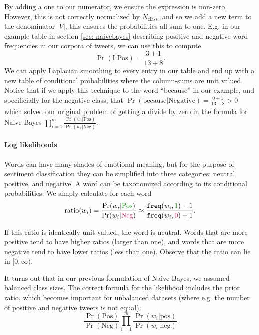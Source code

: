\documentclass[12pt]{article}
\begin{document}
By adding a one to our numerator, we ensure the expression is non-zero. However, this is not correctly normalized by $N_{\textrm{class}}$, and so we add a new term to the denominator $|V|$; this ensures the probabilities all sum to one. E.g. in our example table in section \ref{sec: naivebayes} describing positive and negative word frequencies in our corpora of tweets, we can use this to compute
\[
  \Pr(\textrm{I} | \textrm{Pos}) = \frac{3+1}{13+8}.
\]
We can apply Laplacian smoothing to every entry in our table and end up with a new table of conditional probabilities where the column-sums are unit valued.
Notice that if we apply this technique to the word ``because'' in our example, and specificially for the negative class, that $\Pr(\textrm{because} | \textrm{Negative}) = \frac{0 + 1}{13 + 8} > 0$ which solved our original problem of getting a divide by zero in the formula for Naive Bayes $\prod_{i=1}^m \frac{\Pr(w_i | \textrm{Pos})}{\Pr(w_i | \textrm{Neg})}$.

\paragraph{Log likelihoods} Words can have many shades of emotional meaning, but for the purpose of sentiment classification they can be simplified into three categories: neutral, positive, and negative. A word can be taxonomized according to its conditional probabilities. We simply calculate for each word
\[
  \textrm{ratio}(w_i) = \frac{\Pr(w_i | \textrm{{\color{green!50!black}\textrm{Pos}}})}{\Pr(w_i | {\color{purple!90} \textrm{Neg}})} \approx \frac{\texttt{freq}(w_i, {\color{green!50!black} 1}) + 1}{\texttt{freq}(w_i, {\color{purple!90} 0}) + 1}.
\]

If this ratio is identically unit valued, the word is neutral. Words that are more positive tend to have higher ratios (larger than one), and words that are more negative tend to have lower ratios (less than one). Observe that the ratio can lie in $[0, \infty)$.

It turns out that in our previous formulation of Naive Bayes, we assumed balanced class sizes. The correct formula for the likelihood includes the prior ratio, which becomes important for unbalanced datasets (where e.g. the number of positive and negative tweets is not equal):
\begin{equation}
  \label{eq: completenaivebayeswithprior}
  \frac{\Pr(\textrm{Pos})}{\Pr(\textrm{Neg})} \prod_{i=1}^{m} \frac{\Pr(w_i | \textrm{pos})}{\Pr(w_i|\textrm{neg})}  
\end{equation}
\end{document}
